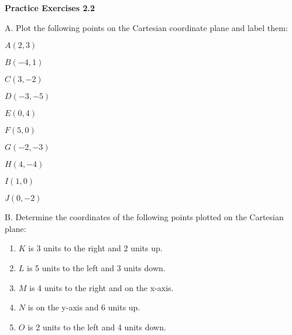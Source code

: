 \noindent\textbf{Practice Exercises 2.2}


A. Plot the following points on the Cartesian coordinate plane and label them:

\begin{enumerate}[label = \color{blue}\arabic*. ]

\begin{multicols}{3}
    \item \(A(2, 3)\)
    \item \(B(-4, 1)\)
    \item \(C(3, -2)\)
    \item \(D(-3, -5)\)
    \item \(E(0, 4)\)
    \item \(F(5, 0)\)
    \item \(G(-2, -3)\)
    \item \(H(4, -4)\)
    \item \(I(1, 0)\)
    \item \(J(0, -2)\)
\end{multicols}
\end{enumerate}

B. Determine the coordinates of the following points plotted on the Cartesian plane:
\begin{enumerate}[label = \color{blue}\arabic*. ]

    \item \(K\) is 3 units to the right and 2 units up.
    \item \(L\) is 5 units to the left and 3 units down.
    \item \(M\) is 4 units to the right and on the x-axis.
    \item \(N\) is on the y-axis and 6 units up.
    \item \(O\) is 2 units to the left and 4 units down.
\end{enumerate}
